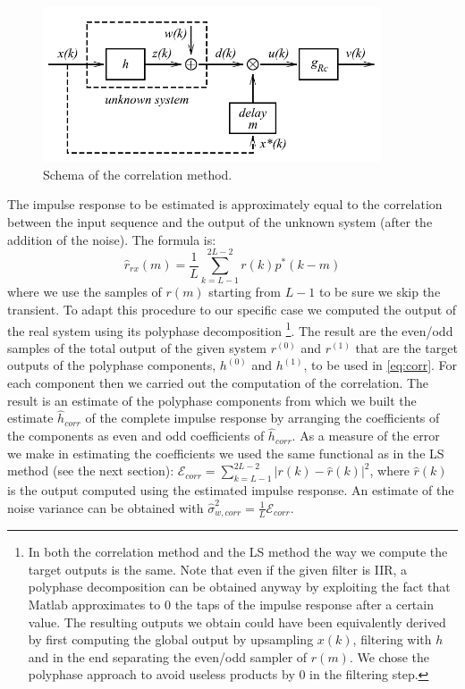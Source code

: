 \documentclass[a4paper,11.5pt]{article}
\begin{document}
\begin{figure}[ht]
	\begin{center}    
		\includegraphics[width=10cm]{figs/systemID.png}
		\caption{Schema of the correlation method.}
		\label{fig:systID}
	\end{center}
\end{figure} 

\noindent The impulse response to be estimated is approximately equal to the correlation between the input sequence and the output of the unknown system (after the addition of the noise). The formula is:
\begin{equation} \label{eq:corr}
\hat{r}_{rx}(m)= \frac{1}{L} \sum_{k=L-1}^{2L-2}r(k)p^*(k-m)
\end{equation}
\noindent where we use the samples of $r(m)$ starting from $L-1$ to be sure we skip the transient. To adapt this procedure to our specific case we computed the output of the real system using its polyphase decomposition \footnote{In both the correlation method and the LS method the way we compute the target outputs is the same. Note that even if the given filter is IIR, a polyphase decomposition can be obtained anyway by exploiting the fact that Matlab approximates to 0 the taps of the impulse response after a certain value. The resulting outputs we obtain could have been equivalently derived by first computing the global output by upsampling $x(k)$, filtering with $h$ and in the end separating the even/odd sampler of $r(m)$. We chose the polyphase approach to avoid useless products by 0 in the filtering step.}. The result are the even/odd samples of the total output of the given system $r^{(0)}$ and $r^{(1)}$ that are the target outputs of the polyphase components, $h^{(0)}$ and $h^{(1)}$, to be used in \ref{eq:corr}. For each component then we carried out the computation of the correlation. The result is an estimate of the polyphase components from which we built the estimate $\hat{h}_{corr}$ of the complete impulse response by arranging the coefficients of the components as even and odd coefficients of $\hat{h}_{corr}$. As a measure of the error we make in estimating the coefficients we used the same functional as in the LS method (see the next section): $\mathcal{E}_{corr} = \sum_{k=L-1}^{2L-2}|r(k)-\hat{r}(k)|^2$, where $\hat{r}(k)$ is the output computed using the estimated impulse response. An estimate of the noise variance can be obtained with $\hat{\sigma}_{w,corr}^2=\frac{1}{L}\mathcal{E}_{corr} $.
\end{document}
